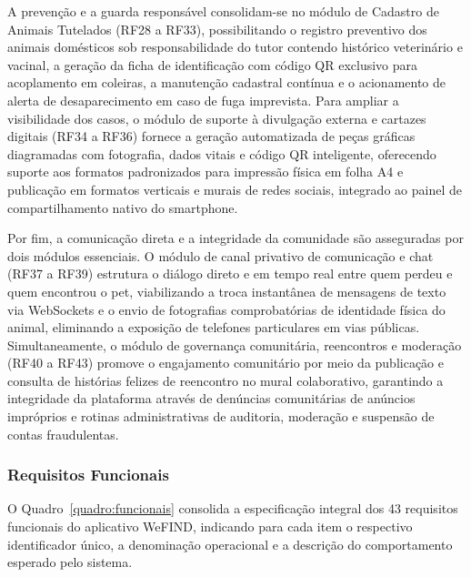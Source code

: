 A prevenção e a guarda responsável consolidam-se no módulo de Cadastro de Animais Tutelados (RF28 a RF33), possibilitando o registro preventivo dos animais domésticos sob responsabilidade do tutor contendo histórico veterinário e vacinal, a geração da ficha de identificação com código QR exclusivo para acoplamento em coleiras, a manutenção cadastral contínua e o acionamento de alerta de desaparecimento em caso de fuga imprevista. Para ampliar a visibilidade dos casos, o módulo de suporte à divulgação externa e cartazes digitais (RF34 a RF36) fornece a geração automatizada de peças gráficas diagramadas com fotografia, dados vitais e código QR inteligente, oferecendo suporte aos formatos padronizados para impressão física em folha A4 e publicação em formatos verticais e murais de redes sociais, integrado ao painel de compartilhamento nativo do smartphone.

Por fim, a comunicação direta e a integridade da comunidade são asseguradas por dois módulos essenciais. O módulo de canal privativo de comunicação e chat (RF37 a RF39) estrutura o diálogo direto e em tempo real entre quem perdeu e quem encontrou o pet, viabilizando a troca instantânea de mensagens de texto via WebSockets e o envio de fotografias comprobatórias de identidade física do animal, eliminando a exposição de telefones particulares em vias públicas. Simultaneamente, o módulo de governança comunitária, reencontros e moderação (RF40 a RF43) promove o engajamento comunitário por meio da publicação e consulta de histórias felizes de reencontro no mural colaborativo, garantindo a integridade da plataforma através de denúncias comunitárias de anúncios impróprios e rotinas administrativas de auditoria, moderação e suspensão de contas fraudulentas.

\clearpage

\subsubsection{Requisitos Funcionais}

O Quadro~\ref{quadro:funcionais} consolida a especificação integral dos 43 requisitos funcionais do aplicativo WeFIND, indicando para cada item o respectivo identificador único, a denominação operacional e a descrição do comportamento esperado pelo sistema.

